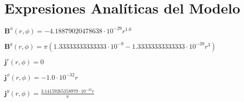 \section*{Expresiones Analíticas del Modelo}


$\textbf{B}^\phi(r, \phi) = - 4.18879020478638 \cdot 10^{-29} r^{1.0}$

$\textbf{B}^y(r, \phi) = \pi \left(1.33333333333333 \cdot 10^{-9} - 1.33333333333333 \cdot 10^{-39} r^{3}\right)$

$\textbf{j}^r(r, \phi) = 0$

$\textbf{j}^\phi(r, \phi) = - 1.0 \cdot 10^{-32} r$

$\textbf{j}^y(r, \phi) = \frac{3.14159265358979 \cdot 10^{-22} r}{\pi}$

